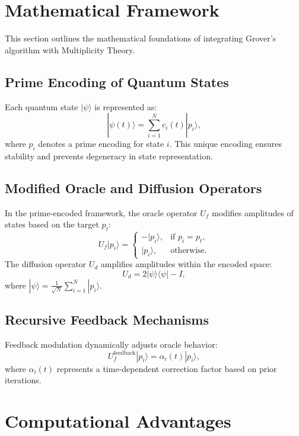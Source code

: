 \documentclass{article}
\theoremstyle{plain}
\begin{document}
\section{Mathematical Framework}
This section outlines the mathematical foundations of integrating Grover's algorithm with Multiplicity Theory.

\subsection{Prime Encoding of Quantum States}
Each quantum state \(|\psi\rangle\) is represented as:
\begin{equation}
|\psi(t)\rangle = \sum_{i=1}^N c_i(t) |p_i\rangle,
\end{equation}
where \(p_i\) denotes a prime encoding for state \(i\). This unique encoding ensures stability and prevents degeneracy in state representation.

\subsection{Modified Oracle and Diffusion Operators}
In the prime-encoded framework, the oracle operator \(U_f\) modifies amplitudes of states based on the target \(p_t\):
\begin{equation}
U_f |p_i\rangle =
\begin{cases}
-|p_i\rangle, & \text{if } p_i = p_t, \\
|p_i\rangle, & \text{otherwise}.
\end{cases}
\end{equation}
The diffusion operator \(U_d\) amplifies amplitudes within the encoded space:
\begin{equation}
U_d = 2|\psi\rangle\langle\psi| - I,
\end{equation}
where \(|\psi\rangle = \frac{1}{\sqrt{N}} \sum_{i=1}^N |p_i\rangle\).

\subsection{Recursive Feedback Mechanisms}
Feedback modulation dynamically adjusts oracle behavior:
\begin{equation}
U_f^{\text{feedback}} |p_i\rangle = \alpha_i(t) |p_i\rangle,
\end{equation}
where \(\alpha_i(t)\) represents a time-dependent correction factor based on prior iterations.

\section{Computational Advantages}
\end{document}
